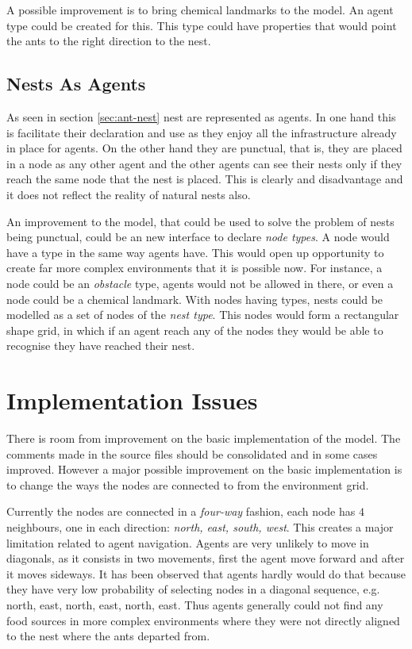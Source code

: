 A possible improvement is to bring chemical landmarks to the model. An agent type could be created for this. This type could have properties that would point the ants to the right direction to the nest.

\subsection{Nests As Agents}

As seen in section \ref{sec:ant-nest} nest are represented as agents. In one hand this is facilitate their declaration and use as they enjoy all the infrastructure already in place for agents. On the other hand they are punctual, that is, they are placed in a node as any other agent and the other agents can see their nests only if they reach the same node that the nest is placed. This is clearly and disadvantage and it does not reflect the reality of natural nests also.

An improvement to the model, that could be used to solve the problem of nests being punctual, could be an new interface to declare \emph{node types}. A node would have a type in the same way agents have. This would open up opportunity to create far more complex environments that it is possible now. For instance, a node could be an  \emph{obstacle} type, agents would not be allowed in there, or even a node could be a chemical landmark. With nodes having types, nests could be modelled as a set of nodes of the \emph{nest type}. This nodes would form a rectangular shape grid, in which if an agent reach any of the nodes they would be able to recognise they have reached their nest.

\section{Implementation Issues}

There is room from improvement on the basic implementation of the model. The comments made in the source files should be consolidated and in some cases improved. However a major possible improvement on the basic implementation is to change the ways the nodes are connected to from the environment grid.  

Currently the nodes are connected in a \emph{four-way} fashion, each node has $4$ neighbours, one in each direction: \emph{north, east, south, west}. This creates a major limitation related to agent navigation. Agents are very unlikely to move in diagonals, as it consists in two movements, first the agent move forward and after it moves sideways. It has been observed that agents hardly would do that because they have very low probability of selecting nodes in a diagonal sequence, e.g. north, east, north, east, north, east. Thus agents generally could not find any food sources in more complex environments where they were not directly aligned to the nest where the ants departed from.

